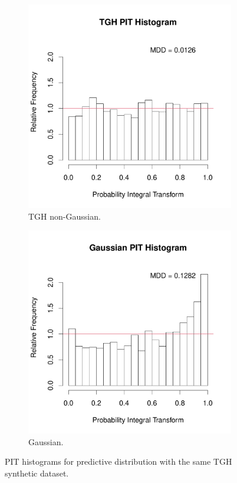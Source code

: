 \documentclass[conference]{IEEEtran}
\begin{document}
\begin{figure}[h]
\centering
\begin{subfigure}{.26\textwidth}
  \centering
  \includegraphics[width=\linewidth]{./figures/PIT_TGH.pdf}
   \caption{TGH non-Gaussian.}
\end{subfigure}%
\begin{subfigure}{.26\textwidth}
  \centering
  \includegraphics[width=\linewidth]{./figures/PIT_Gau.pdf}
  \caption{Gaussian.}
\end{subfigure}
  \caption{PIT histograms for predictive distribution with the same TGH synthetic dataset.}
  \label{fig:PIT_synthetic}
\end{figure}
\end{document}
